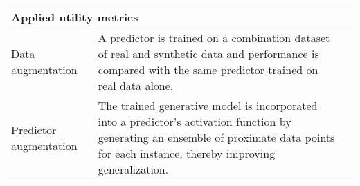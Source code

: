 \begin{table}[htpb]
\begin{tabular}{@{} p{} p{} p{} @{}}
        \multicolumn{3}{Y}{\textbf{Applied utility metrics}}\\ \midrule

        
        Data augmentation & A predictor is trained on a combination dataset of real and synthetic data and performance is compared with the same predictor trained on real data alone. & \cite{Yoon2018-mo}\\
        
        Predictor augmentation & The trained generative model is incorporated into a predictor's activation function by generating an ensemble of proximate data points for each instance, thereby improving generalization. & \cite{Che_2017}\\
        
        \bottomrule
        
        \end{tabular}
\end{table}